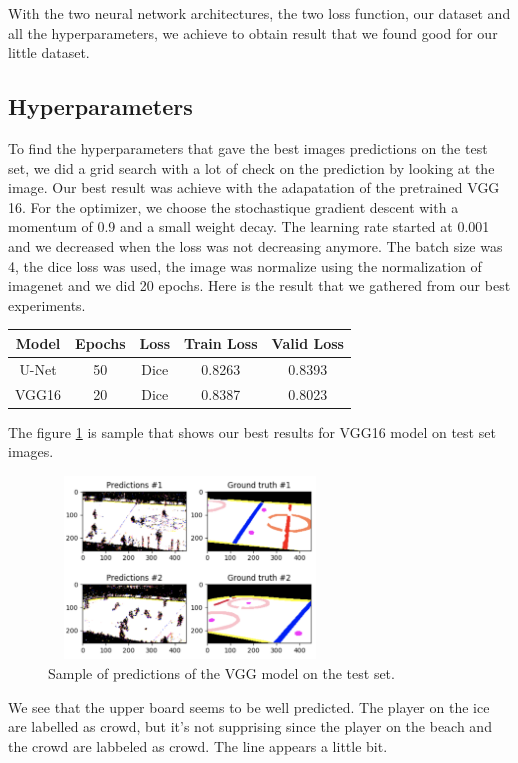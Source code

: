 With the two neural network architectures, the two loss function, our dataset and all the hyperparameters, we achieve to obtain result that we found good for our little dataset. 

\subsection{Hyperparameters}

To find the hyperparameters that gave the best images predictions on the test set, we did a grid search with a lot of check on the prediction by looking at the image. Our best result was achieve with the adapatation of the pretrained VGG 16. For the optimizer, we choose the stochastique gradient descent with a momentum of 0.9 and a small weight decay. The learning rate started at 0.001 and we decreased when the loss was not decreasing anymore. The batch size was 4, the dice loss was used, the image was normalize using the normalization of imagenet and we did 20 epochs. Here is the result that we gathered from our best experiments.
\vspace{2mm}
\setlength{\tabcolsep}{1mm}
\begin{tabular}{c c c c c}
	\toprule
	Model & Epochs & Loss & Train Loss & Valid Loss \\
	\midrule
	U-Net & 50 & Dice & 0.8263 & 0.8393 \\
	VGG16 & 20 & Dice & 0.8387 & 0.8023 \\
\end{tabular}

\vspace{1mm}

 The figure \ref{fig:test} is sample that shows our best results for VGG16 model on test set images.
 
 \begin{figure}[H]
 	\centering
 	\includegraphics[width=7.5cm,height=4.86cm]{figures/test-9-class.png}
 	\caption{Sample of predictions of the VGG model on the test set.}
 	\label{fig:test}
 \end{figure}

We see that the upper board seems to be well predicted. The player on the ice are labelled as crowd, but it's not supprising since the player on the beach and the crowd are labbeled as crowd. The line appears a little bit.
